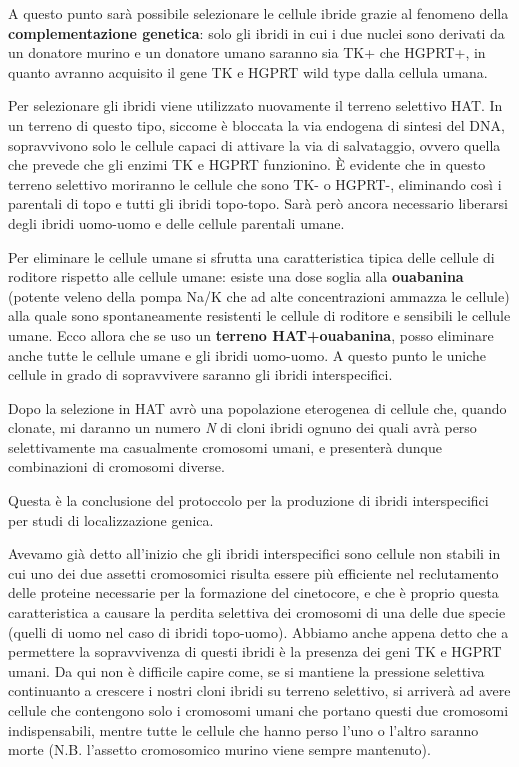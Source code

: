 \documentclass[11pt]{book}
\begin{document}
A questo punto sarà possibile selezionare le cellule ibride grazie al fenomeno della \textbf{complementazione genetica}: solo gli ibridi in cui i due nuclei sono derivati da un donatore murino e un donatore umano saranno sia TK+ che HGPRT+, in quanto avranno acquisito il gene TK e HGPRT wild type dalla cellula umana.

Per selezionare gli ibridi viene utilizzato nuovamente il terreno selettivo HAT. In un terreno di questo tipo, siccome è bloccata la via endogena di sintesi del DNA, sopravvivono solo le cellule capaci di attivare la via di salvataggio, ovvero quella che prevede che gli enzimi TK e HGPRT funzionino. È evidente che in questo terreno selettivo moriranno le cellule che sono TK- o HGPRT-, eliminando così i parentali di topo e tutti gli ibridi topo-topo. 
Sarà però ancora necessario liberarsi degli ibridi uomo-uomo e delle cellule parentali umane.

Per eliminare le cellule umane si sfrutta una caratteristica tipica delle cellule di roditore rispetto alle cellule umane: esiste una dose soglia alla \textbf{ouabanina} (potente veleno della pompa Na/K che ad alte concentrazioni ammazza le cellule) alla quale sono spontaneamente resistenti le cellule di roditore e sensibili le cellule umane. Ecco allora che se uso un \textbf{terreno HAT+ouabanina}, posso eliminare anche tutte le cellule umane e gli ibridi uomo-uomo.
A questo punto le uniche cellule in grado di sopravvivere saranno gli ibridi interspecifici.

Dopo la selezione in HAT avrò una popolazione eterogenea di cellule che, quando clonate, mi daranno un numero \emph{N} di cloni ibridi ognuno dei quali avrà perso selettivamente ma casualmente cromosomi umani, e presenterà dunque combinazioni di cromosomi diverse. 

Questa è la conclusione del protoccolo per la produzione di ibridi interspecifici per studi di localizzazione genica.

Avevamo già detto all'inizio che gli ibridi interspecifici sono cellule non stabili in cui uno dei due assetti cromosomici risulta essere più efficiente nel reclutamento delle proteine necessarie per la formazione del cinetocore, e che è proprio questa caratteristica a causare la perdita selettiva dei cromosomi di una delle due specie (quelli di uomo nel caso di ibridi topo-uomo). Abbiamo anche appena detto che a permettere la sopravvivenza di questi ibridi è la presenza dei geni TK e HGPRT umani. Da qui non è difficile capire come, se si mantiene la pressione selettiva continuanto a crescere i nostri cloni ibridi su terreno selettivo, si arriverà ad avere cellule che contengono solo i cromosomi umani che portano questi due cromosomi indispensabili, mentre tutte le cellule che hanno perso l'uno o l'altro saranno morte (N.B. l'assetto cromosomico murino viene sempre mantenuto).
\end{document}
